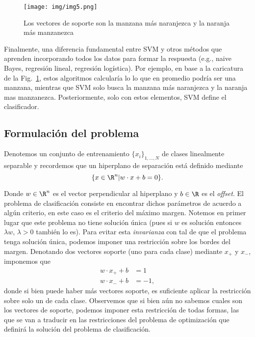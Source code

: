 \begin{figure}[ht]
    \centering
    \texttt{[image: img/img5.png]}
    \caption{Los vectores de soporte son la manzana más naranjezca y la naranja más manzanezca}
    \label{fig:manzanas}
\end{figure}


Finalmente, una diferencia fundamental entre SVM y otros métodos que aprenden incorporando  todos los datos para formar la respuesta (e.g., naive Bayes, regresión lineal, regresión logística). Por ejemplo, en base a la caricatura de la Fig.~\ref{fig:manzanas}, estos algoritmos calcularía lo lo que en promedio podría ser una manzana, mientras que SVM solo busca la manzana más naranjezca y la naranja mas manzanezca. Posteriormente, solo con estos elementos, SVM define el clasificador. 



\subsection{Formulación del problema}

Denotemos un conjunto de entrenamiento $\{x_i\}_{1,...,N}$ de clases linealmente separable y recordemos que un hiperplano de separación está definido mediante
\begin{equation}
    \{x\in \R^n | w\cdot x + b = 0 \}.\label{ec:hiperplano_svm}
\end{equation}

Donde $w\in \R^n$ es el vector perpendicular al hiperplano y $b\in \R$ es el \emph{offset}. El problema de clasificación consiste en encontrar dichos parámetros de acuerdo a algún criterio, en este caso es el criterio del máximo margen. Notemos en primer lugar que este problema no tiene solución única (pues si $w$ es solución entonces $\lambda w$, $\lambda>0$ también lo es). Para evitar esta \emph{invarianza} con tal de que el problema tenga solución única, podemos imponer una restricción sobre los bordes del margen. Denotando dos vectores soporte (uno para cada clase) mediante $x_{+}$ y $x_{-}$, imponemos que 
\begin{align}
 	w\cdot x_{+} + b &= 1 \label{ec:borde_svm1}\\
 	w\cdot x_{-} + b &=  -1,\label{ec:borde_svm2}
 \end{align}
 donde si bien puede haber más vectores soporte, es suficiente aplicar la restricción sobre solo un de cada clase. Observemos que si bien aún no sabemos cuales son los vectores de soporte, podemos imponer esta restricción de todas formas, las que se van a traducir en las restricciones del problema de optimización que definirá la solución del problema de clasificación. 

